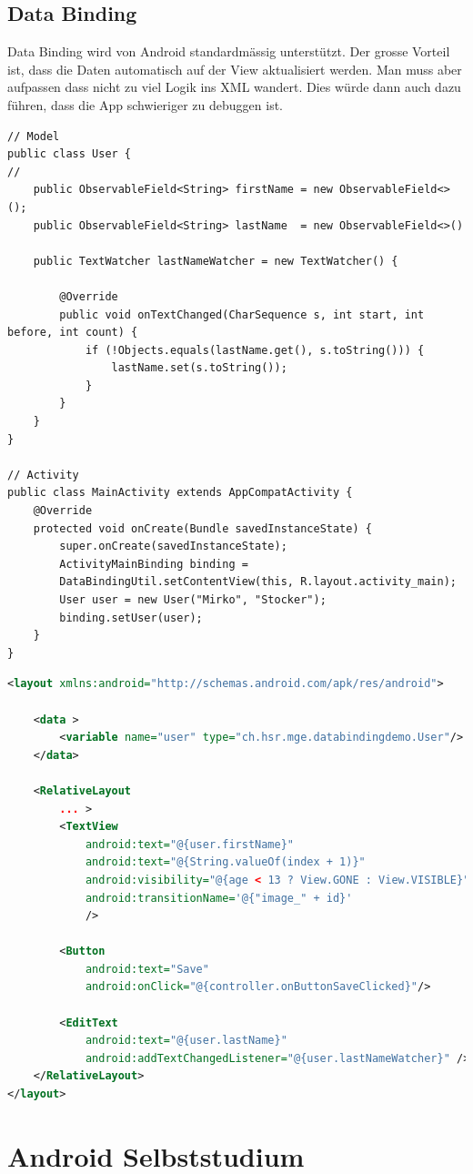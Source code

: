\subsection{Data Binding}
Data Binding wird von Android standardmässig unterstützt. Der grosse Vorteil ist, dass die Daten automatisch auf der View aktualisiert werden. Man muss aber aufpassen dass nicht zu viel Logik ins XML wandert. Dies würde dann auch dazu führen, dass die App schwieriger zu debuggen ist.
\begin{lstlisting}[caption=Data Binding]
// Model
public class User {
//
	public ObservableField<String> firstName = new ObservableField<>();
	public ObservableField<String> lastName  = new ObservableField<>()
		
	public TextWatcher lastNameWatcher = new TextWatcher() {
		
		@Override
		public void onTextChanged(CharSequence s, int start, int before, int count) {
			if (!Objects.equals(lastName.get(), s.toString())) {
				lastName.set(s.toString());
			}
		}	
	}
}

// Activity
public class MainActivity extends AppCompatActivity {
	@Override
	protected void onCreate(Bundle savedInstanceState) {
		super.onCreate(savedInstanceState);
		ActivityMainBinding binding = 
		DataBindingUtil.setContentView(this, R.layout.activity_main);
		User user = new User("Mirko", "Stocker");
		binding.setUser(user);
	}
}
\end{lstlisting}

\begin{lstlisting}[caption=Data Binding XML, language=XML]
<layout xmlns:android="http://schemas.android.com/apk/res/android">

	<data >
		<variable name="user" type="ch.hsr.mge.databindingdemo.User"/>
	</data>
	
	<RelativeLayout
		... >
		<TextView 
			android:text="@{user.firstName}"
			android:text="@{String.valueOf(index + 1)}"
			android:visibility="@{age < 13 ? View.GONE : View.VISIBLE}"
			android:transitionName='@{"image_" + id}'
			/>
		
		<Button
			android:text="Save"
			android:onClick="@{controller.onButtonSaveClicked}"/>
			
		<EditText
			android:text="@{user.lastName}"
			android:addTextChangedListener="@{user.lastNameWatcher}" />
	</RelativeLayout>
</layout>
\end{lstlisting}


\section{Android Selbststudium}
